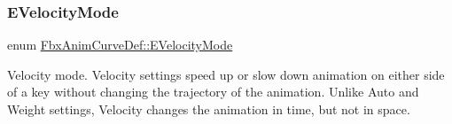 \mbox{\label{class_fbx_anim_curve_def_a747576beffa78ab236d2e140da395fff}} 
\subsubsection{\texorpdfstring{E\+Velocity\+Mode}{EVelocityMode}}
{\footnotesize\ttfamily enum \hyperlink{class_fbx_anim_curve_def_a747576beffa78ab236d2e140da395fff}{Fbx\+Anim\+Curve\+Def\+::\+E\+Velocity\+Mode}}



Velocity mode. Velocity settings speed up or slow down animation on either side of a key without changing the trajectory of the animation. Unlike Auto and Weight settings, Velocity changes the animation in time, but not in space. 

